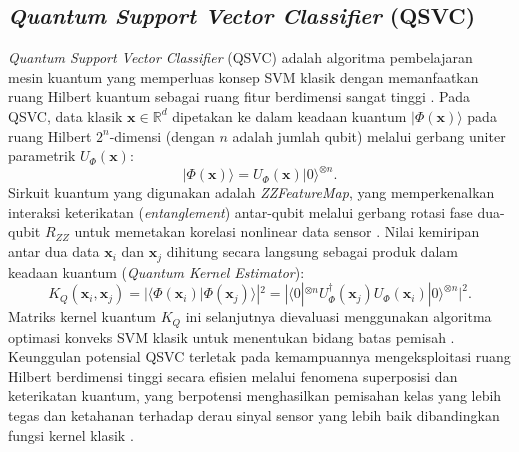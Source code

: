 \subsection{\textit{Quantum Support Vector Classifier} (QSVC)}
\textit{Quantum Support Vector Classifier} (QSVC) adalah algoritma pembelajaran mesin kuantum yang memperluas konsep SVM klasik dengan memanfaatkan ruang Hilbert kuantum sebagai ruang fitur berdimensi sangat tinggi \cite{havlicek2019supervised,schuld2019quantum}. Pada QSVC, data klasik $\mathbf{x} \in \mathbb{R}^d$ dipetakan ke dalam keadaan kuantum $|\Phi(\mathbf{x})\rangle$ pada ruang Hilbert $2^n$-dimensi (dengan $n$ adalah jumlah qubit) melalui gerbang uniter parametrik $U_{\Phi}(\mathbf{x})$:
\begin{equation}
|\Phi(\mathbf{x})\rangle = U_{\Phi}(\mathbf{x}) |0\rangle^{\otimes n}.
\end{equation}
Sirkuit kuantum yang digunakan adalah \textit{ZZFeatureMap}, yang memperkenalkan interaksi keterikatan (\textit{entanglement}) antar-qubit melalui gerbang rotasi fase dua-qubit $R_{ZZ}$ untuk memetakan korelasi nonlinear data sensor \cite{havlicek2019supervised}. Nilai kemiripan antar dua data $\mathbf{x}_i$ dan $\mathbf{x}_j$ dihitung secara langsung sebagai produk dalam keadaan kuantum (\textit{Quantum Kernel Estimator}):
\begin{equation}
K_Q(\mathbf{x}_i, \mathbf{x}_j) = |\langle \Phi(\mathbf{x}_i) | \Phi(\mathbf{x}_j) \rangle|^2 = |\langle 0|^{\otimes n} U_{\Phi}^\dagger(\mathbf{x}_j) U_{\Phi}(\mathbf{x}_i) |0\rangle^{\otimes n}|^2.
\end{equation}
Matriks kernel kuantum $K_Q$ ini selanjutnya dievaluasi menggunakan algoritma optimasi konveks SVM klasik untuk menentukan bidang batas pemisah \cite{schuld2019quantum}. Keunggulan potensial QSVC terletak pada kemampuannya mengeksploitasi ruang Hilbert berdimensi tinggi secara efisien melalui fenomena superposisi dan keterikatan kuantum, yang berpotensi menghasilkan pemisahan kelas yang lebih tegas dan ketahanan terhadap derau sinyal sensor yang lebih baik dibandingkan fungsi kernel klasik \cite{havlicek2019supervised}.

